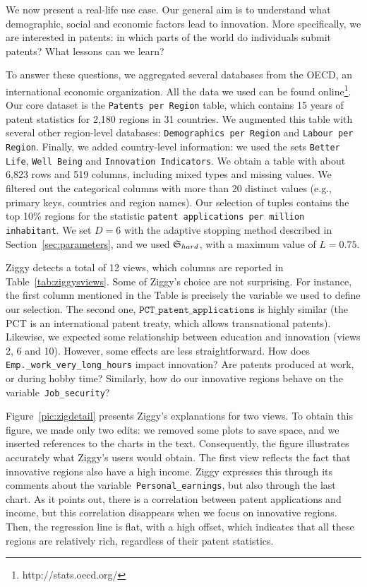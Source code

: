 We now present a real-life use case. Our general aim is to understand what
demographic, social and economic factors lead to innovation. More specifically,
we are interested in patents: in which parts of the world do individuals
submit patents? What lessons can we learn?

To answer these questions, we aggregated several databases from the OECD, an
international economic organization. All the data we used can be found
online\footnote{http://stats.oecd.org/}. Our core dataset is the
\texttt{Patents per Region} table, which contains 15 years of patent statistics
for 2,180 regions in 31 countries. We augmented this table with several other
region-level databases: \texttt{Demographics per Region} and \texttt{Labour per
Region}. Finally, we added country-level information: we used the sets
\texttt{Better Life}, \texttt{Well Being} and \texttt{Innovation Indicators}.
We obtain a table with about 6,823 rows and 519 columns, including mixed types
and missing values. We filtered out the categorical columns with
more than 20 distinct values (e.g., primary keys, countries and region names).
Our selection of tuples contains the top 10\% regions for the statistic
\texttt{patent applications per million inhabitant}. We set $D=6$ with the
adaptive stopping method described in Section~\ref{sec:parameters}, and we used
$\mathfrak{S}_{hard}$, with a maximum value of $L=0.75$.

Ziggy detects a total of 12 views, which columns are reported in
Table~\ref{tab:ziggysviews}. Some of Ziggy's choice are not surprising. For
instance, the first column mentioned in the Table is precisely the variable we
used to define our selection. The second one,
$\texttt{PCT\_patent\_applications}$ is highly similar (the PCT is an
international patent treaty, which allows transnational patents). Likewise, we
expected some relationship between education and innovation (views 2, 6 and
10). However, some effects are less straightforward. How does
\texttt{Emp.\_work\_very\_long\_hours} impact innovation? Are patents produced
at work, or during hobby time? Similarly, how do our innovative regions behave
on the variable~\texttt{Job\_security}?

Figure~\ref{pic:zigdetail} presents Ziggy's explanations for two views. To
obtain this figure, we made only two edits: we removed some plots to save
space, and we inserted references to the charts in the text. Consequently, the
figure illustrates accurately what Ziggy's users would obtain. The first view
reflects the fact that innovative regions also have a high income. Ziggy
expresses this through its comments about the
variable~\texttt{Personal\_earnings}, but also through the last chart. As it
points out, there is a correlation between patent applications and income, but
this correlation disappears when we focus on innovative regions. Then, the
regression line is flat, with a high offset, which indicates that all these
regions are relatively rich, regardless of their patent statistics.

